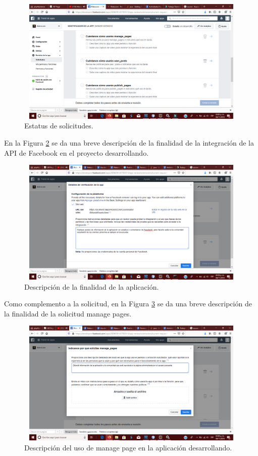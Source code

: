 	\begin{figure}[hbt!]
		\centering
		\includegraphics[width=15cm, height=6cm]{Imagenes/FacebookAPI/Facebook7}
		\caption{Estatus de solicitudes.}
		\label{creacionFB7}
	\end{figure}
	
	\noindent En la Figura \ref{creacionFB4} se da una breve descripción de la finalidad de la integración de la API de Facebook en el proyecto desarrollando.
\pagebreak
	\begin{figure}[hbt!]
		\centering
		\includegraphics[width=15cm, height=6cm]{Imagenes/FacebookAPI/Facebook4}
		\caption{Descripción de la finalidad de la aplicación.}
		\label{creacionFB4}
	\end{figure}

	\noindent Como complemento a la solicitud, en la Figura \ref{creacionFB5} se da una breve descripción de la finalidad de la solicitud manage pages.

	\begin{figure}[hbt!]
		\centering
		\includegraphics[width=15cm, height=6cm]{Imagenes/FacebookAPI/Facebook5}
		\caption{Descripción del uso de manage page en la aplicación desarrollando.}
		\label{creacionFB5}
	\end{figure}

